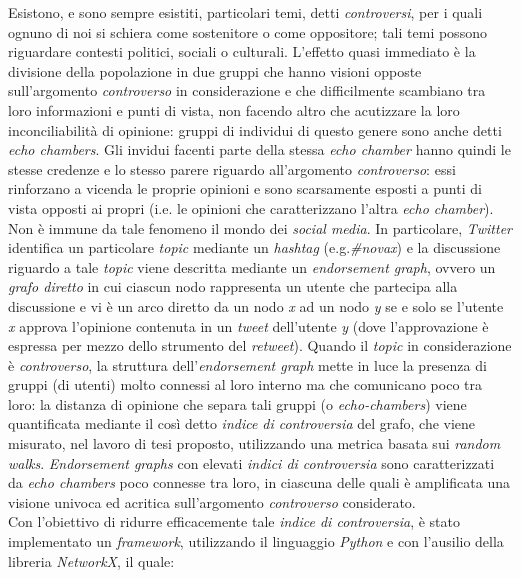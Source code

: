 \documentclass[trieste,12pt]{toptesi}
\begin{document}
\sommario
Esistono, e sono sempre esistiti, particolari temi, detti \textit{controversi}, per i quali ognuno di noi si schiera come sostenitore o come oppositore; tali temi possono riguardare contesti politici, sociali o culturali. L'effetto quasi immediato è la divisione della popolazione in due gruppi che hanno visioni opposte sull'argomento \textit{controverso} in considerazione e che difficilmente scambiano tra loro informazioni e punti di vista, non facendo altro che acutizzare la loro inconciliabilità di opinione: gruppi di individui di questo genere sono anche detti \textit{echo chambers}. Gli invidui facenti parte della stessa \textit{echo chamber} hanno quindi le stesse credenze e lo stesso parere riguardo all'argomento \textit{controverso}: essi rinforzano a vicenda le proprie opinioni e sono scarsamente esposti a punti di vista opposti ai propri (i.e. le opinioni che caratterizzano l'altra \textit{echo chamber}). Non è immune da tale fenomeno il mondo dei \textit{social media}. In particolare, \textit{Twitter} identifica un particolare \textit{topic} mediante un \textit{hashtag} (e.g.\textit{\#novax}) e la discussione riguardo a tale \textit{topic} viene descritta mediante un \textit{endorsement graph}, ovvero un \textit{grafo diretto} in cui ciascun nodo rappresenta un utente che partecipa alla discussione e vi è un arco diretto da un nodo \textit{x} ad un nodo \textit{y} se e solo se l'utente \textit{x} approva l'opinione contenuta in un \textit{tweet} dell'utente \textit{y} (dove l'approvazione è espressa per mezzo dello strumento del \textit{retweet}). Quando il \textit{topic} in considerazione è \textit{controverso}, la struttura dell'\textit{endorsement graph} mette in luce la presenza di gruppi (di utenti) molto connessi al loro interno ma che comunicano poco tra loro: la distanza di opinione che separa tali gruppi (o \textit{echo-chambers}) viene quantificata mediante il così detto \textit{indice di controversia} del grafo, che viene misurato, nel lavoro di tesi proposto, utilizzando una metrica basata sui \textit{random walks}. \textit{Endorsement graphs} con elevati \textit{indici di controversia} sono caratterizzati da \textit{echo chambers} poco connesse tra loro, in ciascuna delle quali è amplificata una visione univoca ed acritica sull'argomento \textit{controverso} considerato.\\Con l'obiettivo di ridurre efficacemente tale \textit{indice di controversia}, è stato implementato un \textit{framework}, utilizzando il linguaggio \textit{Python} e con l'ausilio della libreria \textit{NetworkX}, il quale:
\end{document}
